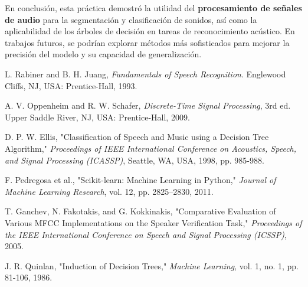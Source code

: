 \documentclass{report}
\begin{document}
En conclusión, esta práctica demostró la utilidad del \textbf{procesamiento de señales de audio} para la segmentación y clasificación de sonidos, así como la aplicabilidad de los árboles de decisión en tareas de reconocimiento acústico. En trabajos futuros, se podrían explorar métodos más sofisticados para mejorar la precisión del modelo y su capacidad de generalización.

\newpage
\begin{thebibliography}{00}

     L. Rabiner and B. H. Juang, \textit{Fundamentals of Speech Recognition}. Englewood Cliffs, NJ, USA: Prentice-Hall, 1993.
    
     A. V. Oppenheim and R. W. Schafer, \textit{Discrete-Time Signal Processing}, 3rd ed. Upper Saddle River, NJ, USA: Prentice-Hall, 2009.
    
     D. P. W. Ellis, "Classification of Speech and Music using a Decision Tree Algorithm," \textit{Proceedings of IEEE International Conference on Acoustics, Speech, and Signal Processing (ICASSP)}, Seattle, WA, USA, 1998, pp. 985-988.
    
     F. Pedregosa et al., "Scikit-learn: Machine Learning in Python," \textit{Journal of Machine Learning Research}, vol. 12, pp. 2825–2830, 2011.
    
     T. Ganchev, N. Fakotakis, and G. Kokkinakis, "Comparative Evaluation of Various MFCC Implementations on the Speaker Verification Task," \textit{Proceedings of the IEEE International Conference on Speech and Signal Processing (ICSSP)}, 2005.
    
     J. R. Quinlan, "Induction of Decision Trees," \textit{Machine Learning}, vol. 1, no. 1, pp. 81-106, 1986.
    
    \end{thebibliography}
    
\end{document}
